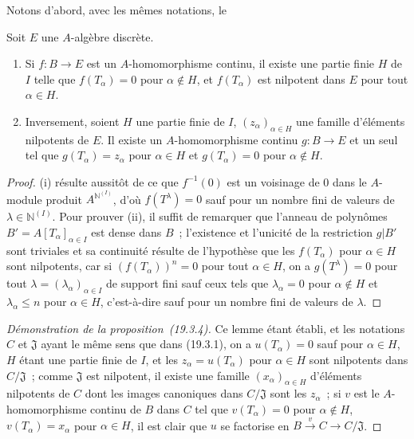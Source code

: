 Notons d'abord, avec les mêmes notations, le
\begin{lemma}[19.3.4.1]
\label{0.19.3.4.1-fr}
Soit $E$ une $A$-algèbre discrète.
\begin{enumerate}
  \item[\textup{(i)}] Si $f:B\to E$ est un $A$-homomorphisme continu, il existe une
  partie finie $H$ de $I$ telle que $f(T_\alpha)=0$ pour $\alpha\notin H$,
  et $f(T_\alpha)$ est nilpotent dans $E$ pour tout $\alpha\in H$.
  \item[\textup{(ii)}] Inversement, soient $H$ une partie finie de $I$,
  $(z_\alpha)_{\alpha\in H}$ une famille d'éléments nilpotents de $E$.
  Il existe un $A$-homomorphisme continu $g:B\to E$ et un seul tel que
  $g(T_\alpha)=z_\alpha$ pour $\alpha\in H$ et
  $g(T_\alpha)=0$ pour $\alpha\notin H$.
\end{enumerate}
\end{lemma}

\begin{proof}
(i) résulte aussitôt de ce que $f^{-1}(0)$ est un voisinage de $0$ dans le
$A$-module produit $A^{\mathbb{N}^{(I)}}$, d'où $f(T^\lambda)=0$ sauf pour un
nombre fini de valeurs de $\lambda\in\mathbb{N}^{(I)}$. Pour prouver (ii), il
suffit de remarquer que l'anneau de polynômes
$B'=A[T_\alpha]_{\alpha\in I}$ est dense dans $B$~; l'existence et
l'unicité de la restriction $g|B'$ sont triviales et sa continuité résulte de
l'hypothèse que les $f(T_\alpha)$ pour $\alpha\in H$ sont nilpotents,
car si $(f(T_\alpha))^n=0$ pour tout $\alpha\in H$, on a
$g(T^\lambda)=0$ pour tout $\lambda=(\lambda_\alpha)_{\alpha\in I}$ de
support fini sauf ceux tels que $\lambda_\alpha=0$ pour
$\alpha\notin H$ et $\lambda_\alpha\leq n$ pour
$\alpha\in H$, c'est-à-dire sauf pour un nombre fini de valeurs de
$\lambda$.
\end{proof}

\begin{proof}[Démonstration de la proposition~{\rm(19.3.4)}]
Ce lemme étant établi, et les notations $C$ et $\mathfrak J$ ayant le même
sens que dans (19.3.1), on a $u(T_\alpha)=0$ sauf pour
$\alpha\in H$, $H$ étant une partie finie de $I$, et les
$z_\alpha=u(T_\alpha)$ pour $\alpha\in H$ sont nilpotents dans
$C/\mathfrak J$~; comme $\mathfrak J$ est nilpotent, il existe une famille
$(x_\alpha)_{\alpha\in H}$ d'éléments nilpotents de $C$ dont les images
canoniques dans $C/\mathfrak J$ sont les $z_\alpha$~; si $v$ est le
$A$-homomorphisme continu de $B$ dans $C$ tel que
$v(T_\alpha)=0$ pour $\alpha\notin H$, $v(T_\alpha)=x_\alpha$ pour
$\alpha\in H$, il est clair que $u$ se factorise en
$B\xrightarrow{v}C\to C/\mathfrak J$.
\end{proof}

